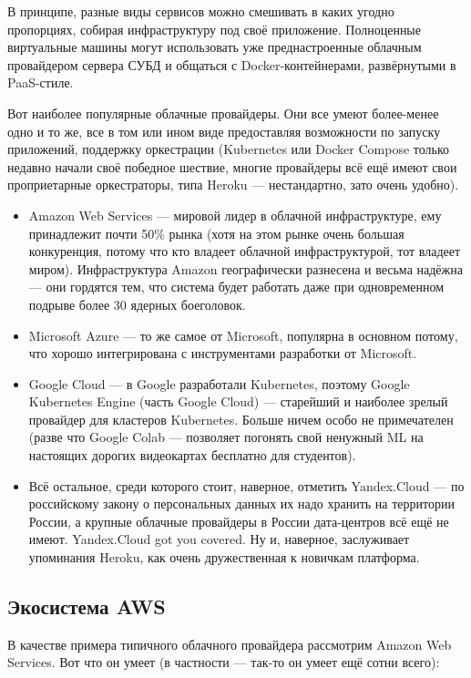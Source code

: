 \documentclass[a5paper]{article}
\begin{document}
В принципе, разные виды сервисов можно смешивать в каких угодно пропорциях, собирая инфраструктуру под своё приложение. Полноценные виртуальные машины могут использовать уже преднастроенные облачным провайдером сервера СУБД и общаться с Docker-контейнерами, развёрнутыми в PaaS-стиле.

Вот наиболее популярные облачные провайдеры. Они все умеют более-менее одно и то же, все в том или ином виде предоставляя возможности по запуску приложений, поддержку оркестрации (Kubernetes или Docker Compose только недавно начали своё победное шествие, многие провайдеры всё ещё имеют свои проприетарные оркестраторы, типа Heroku --- нестандартно, зато очень удобно). 

\begin{itemize}
    \item Amazon Web Services --- мировой лидер в облачной инфраструктуре, ему принадлежит почти 50\% рынка (хотя на этом рынке очень большая конкуренция, потому что кто владеет облачной инфраструктурой, тот владеет миром). Инфраструктура Amazon географически разнесена и весьма надёжна --- они гордятся тем, что система будет работать даже при одновременном подрыве более 30 ядерных боеголовок.
    \item Microsoft Azure --- то же самое от Microsoft, популярна в основном потому, что хорошо интегрирована с инструментами разработки от Microsoft.
    \item Google Cloud --- в Google разработали Kubernetes, поэтому Google Kubernetes Engine (часть Google Cloud) --- старейший и наиболее зрелый провайдер для кластеров Kubernetes. Больше ничем особо не примечателен (разве что Google Colab --- позволяет погонять свой ненужный ML на настоящих дорогих видеокартах бесплатно для студентов).
    \item Всё остальное, среди которого стоит, наверное, отметить Yandex.Cloud --- по российскому закону о персональных данных их надо хранить на территории России, а крупные облачные провайдеры в России дата-центров всё ещё не имеют. Yandex.Cloud got you covered. Ну и, наверное, заслуживает упоминания Heroku, как очень дружественная к новичкам платформа.
\end{itemize}

\subsection{Экосистема AWS}

В качестве примера типичного облачного провайдера рассмотрим Amazon Web Services. Вот что он умеет (в частности --- так-то он умеет ещё сотни всего):
\end{document}

